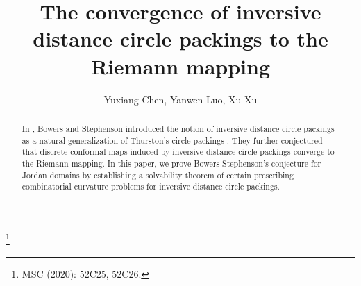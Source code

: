 \documentclass[12pt]{amsart}
\begin{document}
\title{The convergence of inversive distance circle packings to the Riemann mapping}
\author{Yuxiang Chen, Yanwen Luo, Xu Xu}

\address{School of Mathematics and Statistics, Wuhan University, Wuhan, 430072, P.R.China}

\address{Department of Mathematics, Oklahoma State University, Stillwater, 74074, USA
 }

\address{School of Mathematics and Statistics, Wuhan University, Wuhan, 430072, P.R.China}


\thanks{MSC (2020): 52C25, 52C26.}





\begin{abstract}
In \cite{BS}, Bowers and Stephenson  introduced the notion of inversive distance circle packings as a natural generalization of Thurston's
circle packings \cite{Th}.
They further conjectured that discrete conformal maps induced by inversive distance circle packings converge to the Riemann mapping.
In this paper, we prove Bowers-Stephenson's conjecture for Jordan domains
by establishing a solvability theorem of certain prescribing combinatorial curvature problems for inversive distance circle packings.
\end{abstract}

\maketitle


\end{document}
